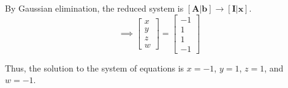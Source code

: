 By Gaussian elimination, the reduced system is \( [\mathbf{A} | \mathbf{b}] \longrightarrow [\mathbf{I} | \mathbf{x}] \).
\[
    \implies
    \begin{bmatrix}
        x \\
        y \\
        z \\
        w
    \end{bmatrix}
    =
    \begin{bmatrix}
        -1 \\
        1  \\
        1  \\
        -1
    \end{bmatrix}
\]

Thus, the solution to the system of equations is \( x = -1 \), \( y = 1 \), \( z = 1 \), and \( w = -1 \).
